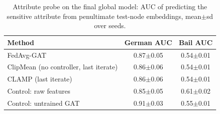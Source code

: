 \begin{table}[tbp]
\centering
\footnotesize
\caption{Attribute probe on the final global model: AUC of predicting the sensitive attribute from penultimate test-node embeddings, mean$\pm$sd over seeds.}
\label{tab:privacy_probe}
\begin{tabular}{lcc}
\toprule
Method & German AUC & Bail AUC \\
\midrule
FedAvg-GAT & 0.87$\pm$0.05 & 0.54$\pm$0.01 \\
ClipMean (no controller, last iterate) & 0.86$\pm$0.06 & 0.54$\pm$0.01 \\
CLAMP (last iterate) & 0.86$\pm$0.06 & 0.54$\pm$0.01 \\
Control: raw features & 0.85$\pm$0.05 & 0.61$\pm$0.02 \\
Control: untrained GAT & 0.91$\pm$0.03 & 0.55$\pm$0.01 \\
\bottomrule
\end{tabular}
\end{table}
